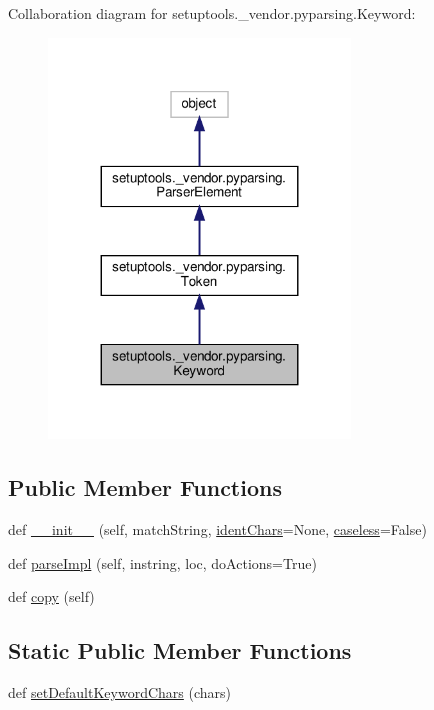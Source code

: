 Collaboration diagram for setuptools.\+\_\+vendor.\+pyparsing.\+Keyword\+:
\nopagebreak
\begin{figure}[H]
\begin{center}
\leavevmode
\includegraphics[width=227pt]{classsetuptools_1_1__vendor_1_1pyparsing_1_1Keyword__coll__graph}
\end{center}
\end{figure}
\subsection*{Public Member Functions}
\begin{DoxyCompactItemize}
\item 
def \hyperlink{classsetuptools_1_1__vendor_1_1pyparsing_1_1Keyword_a7037e6d7d6b3273f381766cb7d803178}{\+\_\+\+\_\+init\+\_\+\+\_\+} (self, match\+String, \hyperlink{classsetuptools_1_1__vendor_1_1pyparsing_1_1Keyword_aa4030fb7a4311114af357a36bb59989f}{ident\+Chars}=None, \hyperlink{classsetuptools_1_1__vendor_1_1pyparsing_1_1Keyword_a995a21960280a362dcb69aa1660ecc0f}{caseless}=False)
\item 
def \hyperlink{classsetuptools_1_1__vendor_1_1pyparsing_1_1Keyword_a9cbc8c5da7a96bb2fe7d9a9d6f183e94}{parse\+Impl} (self, instring, loc, do\+Actions=True)
\item 
def \hyperlink{classsetuptools_1_1__vendor_1_1pyparsing_1_1Keyword_a4755042f0debfca0e86a468001a77957}{copy} (self)
\end{DoxyCompactItemize}
\subsection*{Static Public Member Functions}
\begin{DoxyCompactItemize}
\item 
def \hyperlink{classsetuptools_1_1__vendor_1_1pyparsing_1_1Keyword_a569380346ac0c70c38a8c46ae2a311d1}{set\+Default\+Keyword\+Chars} (chars)
\end{DoxyCompactItemize}
